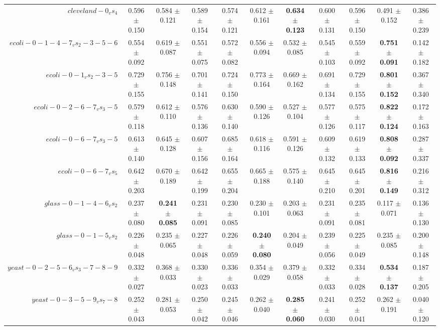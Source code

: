 \begin{table}[!ht]
{\begin{tabular}{r c c c c c c c c c c}
$cleveland-0_vs_4$ & 0.596 $\pm$ 0.150 & 0.584 $\pm$ 0.121 & 0.589 $\pm$ 0.154 & 0.574 $\pm$ 0.121 & 0.612 $\pm$ 0.161 & \textbf{0.634 $\pm$ 0.123} & 0.600 $\pm$ 0.131 & 0.596 $\pm$ 0.150 & 0.491 $\pm$ 0.152 & 0.386 $\pm$ 0.239 \\
$ecoli-0-1-4-7_vs_2-3-5-6$ & 0.554 $\pm$ 0.092 & 0.619 $\pm$ 0.087 & 0.551 $\pm$ 0.075 & 0.572 $\pm$ 0.082 & 0.556 $\pm$ 0.094 & 0.532 $\pm$ 0.085 & 0.545 $\pm$ 0.103 & 0.559 $\pm$ 0.092 & \textbf{0.751 $\pm$ 0.091} & 0.142 $\pm$ 0.182 \\
$ecoli-0-1_vs_2-3-5$ & 0.729 $\pm$ 0.155 & 0.756 $\pm$ 0.148 & 0.701 $\pm$ 0.141 & 0.724 $\pm$ 0.150 & 0.773 $\pm$ 0.164 & 0.669 $\pm$ 0.162 & 0.691 $\pm$ 0.134 & 0.729 $\pm$ 0.155 & \textbf{0.801 $\pm$ 0.152} & 0.367 $\pm$ 0.340 \\
$ecoli-0-2-6-7_vs_3-5$ & 0.579 $\pm$ 0.118 & 0.612 $\pm$ 0.110 & 0.576 $\pm$ 0.136 & 0.630 $\pm$ 0.140 & 0.590 $\pm$ 0.126 & 0.527 $\pm$ 0.104 & 0.577 $\pm$ 0.126 & 0.575 $\pm$ 0.117 & \textbf{0.822 $\pm$ 0.124} & 0.172 $\pm$ 0.163 \\
$ecoli-0-6-7_vs_3-5$ & 0.613 $\pm$ 0.140 & 0.645 $\pm$ 0.128 & 0.607 $\pm$ 0.156 & 0.685 $\pm$ 0.164 & 0.618 $\pm$ 0.116 & 0.591 $\pm$ 0.126 & 0.609 $\pm$ 0.132 & 0.619 $\pm$ 0.133 & \textbf{0.808 $\pm$ 0.092} & 0.287 $\pm$ 0.337 \\
$ecoli-0-6-7_vs_5$ & 0.642 $\pm$ 0.203 & 0.670 $\pm$ 0.189 & 0.642 $\pm$ 0.199 & 0.655 $\pm$ 0.204 & 0.665 $\pm$ 0.188 & 0.575 $\pm$ 0.140 & 0.645 $\pm$ 0.210 & 0.645 $\pm$ 0.201 & \textbf{0.816 $\pm$ 0.149} & 0.216 $\pm$ 0.312 \\
$glass-0-1-4-6_vs_2$ & 0.237 $\pm$ 0.080 & \textbf{0.241 $\pm$ 0.085} & 0.231 $\pm$ 0.091 & 0.230 $\pm$ 0.085 & 0.230 $\pm$ 0.101 & 0.203 $\pm$ 0.063 & 0.231 $\pm$ 0.091 & 0.235 $\pm$ 0.081 & 0.117 $\pm$ 0.071 & 0.136 $\pm$ 0.130 \\
$glass-0-1-5_vs_2$ & 0.226 $\pm$ 0.048 & 0.235 $\pm$ 0.065 & 0.227 $\pm$ 0.048 & 0.226 $\pm$ 0.059 & \textbf{0.240 $\pm$ 0.080} & 0.204 $\pm$ 0.049 & 0.239 $\pm$ 0.056 & 0.225 $\pm$ 0.049 & 0.235 $\pm$ 0.085 & 0.200 $\pm$ 0.148 \\
$yeast-0-2-5-6_vs_3-7-8-9$ & 0.332 $\pm$ 0.027 & 0.368 $\pm$ 0.033 & 0.330 $\pm$ 0.023 & 0.336 $\pm$ 0.033 & 0.354 $\pm$ 0.029 & 0.379 $\pm$ 0.058 & 0.332 $\pm$ 0.033 & 0.334 $\pm$ 0.028 & \textbf{0.534 $\pm$ 0.137} & 0.187 $\pm$ 0.205 \\
$yeast-0-3-5-9_vs_7-8$ & 0.252 $\pm$ 0.043 & 0.281 $\pm$ 0.053 & 0.250 $\pm$ 0.042 & 0.245 $\pm$ 0.046 & 0.262 $\pm$ 0.040 & \textbf{0.285 $\pm$ 0.060} & 0.241 $\pm$ 0.030 & 0.252 $\pm$ 0.041 & 0.262 $\pm$ 0.191 & 0.040 $\pm$ 0.120 \\

\end{tabular}}
\end{table}

